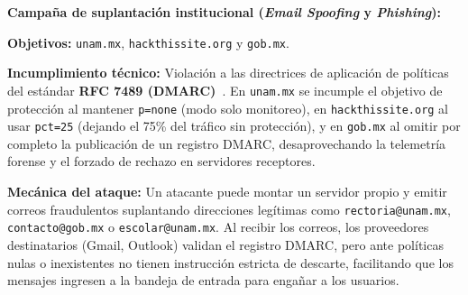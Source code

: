 \begin{enumerateColor}
    \item \textbf{Campaña de suplantación institucional (\textit{Email Spoofing} y \textit{Phishing}):}
    \begin{itemizeColor}
        \item \textbf{Objetivos:} \texttt{unam.mx}, \texttt{hackthissite.org} y \texttt{gob.mx}.
        \item \textbf{Incumplimiento técnico:} Violación a las directrices de aplicación de políticas del estándar \textbf{RFC 7489 (DMARC)}~\cite{rfc7489_dmarc}. En \texttt{unam.mx} se incumple el objetivo de protección al mantener \texttt{p=none} (modo solo monitoreo), en \texttt{hackthissite.org} al usar \texttt{pct=25} (dejando el 75\% del tráfico sin protección), y en \texttt{gob.mx} al omitir por completo la publicación de un registro DMARC, desaprovechando la telemetría forense y el forzado de rechazo en servidores receptores.
        \item \textbf{Mecánica del ataque:} Un atacante puede montar un servidor propio y emitir correos fraudulentos suplantando direcciones legítimas como \texttt{rectoria@unam.mx}, \texttt{contacto@gob.mx} o \texttt{escolar@unam.mx}. Al recibir los correos, los proveedores destinatarios (Gmail, Outlook) validan el registro DMARC, pero ante políticas nulas o inexistentes no tienen instrucción estricta de descarte, facilitando que los mensajes ingresen a la bandeja de entrada para engañar a los usuarios.
    \end{itemizeColor}


\end{enumerateColor}
